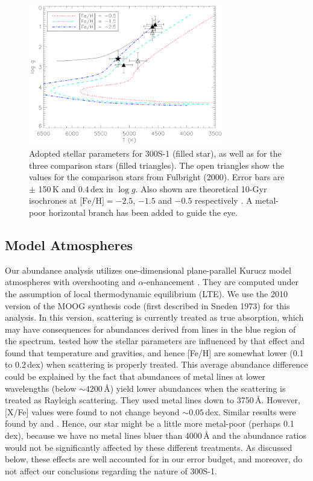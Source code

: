 \documentclass{emulateapj}
\begin{document}
\begin{figure}
 \begin{center}
  \includegraphics[width=8.5cm,clip=true,bbllx=12, bblly=182,bburx=600, bbury=610]{isochrones_10Gyr_withhb.ps}
  \caption{Adopted stellar parameters for 300S-1 (filled star), as
    well as for the three comparison stars (filled triangles). The
    open triangles show the values for the comparison stars from
    Fulbright (2000). Error bars are $\pm$ 150\,K and 0.4\,dex in
    $\log g$. Also shown are theoretical 10-Gyr isochrones at
    $\mbox{[Fe/H]} = -2.5$, $-1.5$ and $-0.5$ respectively
    \citep{Kim2002}. A metal-poor horizontal branch has been added to
    guide the eye.}
  \label{fig:isochr}
 \end{center}
\end{figure}

\subsection{Model Atmospheres}
Our abundance analysis utilizes one-dimensional plane-parallel Kurucz
model atmospheres with overshooting and $\alpha$-enhancement
\citep{kurucz}. They are computed under the assumption of local
thermodynamic equilibrium (LTE). We use the 2010 version of the MOOG
synthesis code (first described in Sneden 1973)\nocite{moog} for this
analysis.  In this version, scattering is currently treated as true
absorption, which may have consequences for abundances derived from
lines in the blue region of the spectrum. \citet{hollek} tested how
the stellar parameters are influenced by that effect and found that
temperature and gravities, and hence [Fe/H] are somewhat lower (0.1 to
0.2\,dex) when scattering is properly treated. This average abundance
difference could be explained by the fact that abundances of metal
lines at lower wavelengths (below $\sim4200$\,{\AA}) yield lower
abundances when the scattering is treated as Rayleigh scattering. They
used metal lines down to 3750\,{\AA}. However, [X/Fe] values were
found to not change beyond $\sim0.05$\,dex. Similar results were found
by \citet{Frebel2010a} and \citet{venn12}. Hence, our star might be a
little more metal-poor (perhaps 0.1\,dex), because we have no
metal lines bluer than 4000\,{\AA} and the abundance ratios would not
be significantly affected by these different treatments. As discussed
below, these effects are well accounted for in our error budget, and
moreover, do not affect our conclusions regarding the nature of
300S-1.
\end{document}
